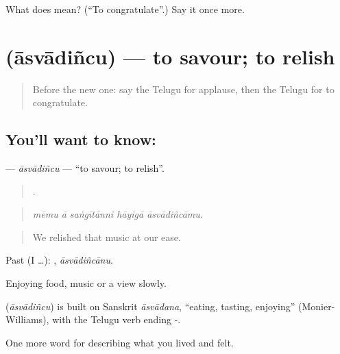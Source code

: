 \begin{tcolorbox}[breakable,colback=teal!4,colframe=teal!35!black,title={Before you move on}]
What does  mean? (\textquotedblleft{}To congratulate\textquotedblright{}.) Say it once more.
\end{tcolorbox}
\section[\texorpdfstring{\te{ఆస్వాదించు} (āsvādiñcu)}{ఆస్వాదించు (āsvādiñcu)}]{ (āsvādiñcu) — to savour; to relish}

\label{lesson:TE-C543-asvadincu}



\begin{quote}
Before the new one: say the Telugu for applause, then the Telugu for to congratulate.
\end{quote}

\subsection*{You'll want to know: }
\textbf{} — \emph{āsvādiñcu} — \textquotedblleft{}to savour; to relish\textquotedblright{}.

\begin{quote}
    .
\end{quote}

\begin{quote}
\emph{mēmu ā saṅgītānni hāyigā āsvādiñcāmu.}
\end{quote}

\begin{quote}
We relished that music at our ease.
\end{quote}

Past (I …): , \emph{āsvādiñcānu}.

Enjoying food, music or a view slowly.

\begin{cousinweb}
\textbf{} (\emph{āsvādiñcu}) is built on Sanskrit \emph{āsvādana}, \textquotedblleft{}eating, tasting, enjoying\textquotedblright{} (Monier-Williams), with the Telugu verb ending -.
\end{cousinweb}

\begin{grammarlens}[title={What you've built}]
One more word for describing what you lived and felt.
\end{grammarlens}

